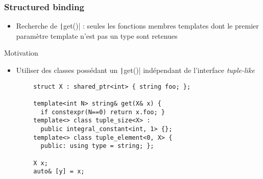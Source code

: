 \documentclass[C++.tex]{subfiles}
\begin{document}
\begin{frame}[fragile]
	\frametitle{Structured binding}
	\begin{itemize}
		\item Recherche de \texttt|get()| : seules les fonctions membres templates dont le premier paramètre template n'est pas un type sont retenues
	\end{itemize}

	\begin{block}{Motivation}
		\begin{itemize}
			\item Utiliser des classes possédant un \texttt|get()| indépendant de l'interface \textit{tuple-like}
		\end{itemize}
	\end{block}

	\begin{verbatim}
		struct X : shared_ptr<int> { string foo; };

		template<int N> string& get(X& x) { 
		  if constexpr(N==0) return x.foo; }
		template<> class tuple_size<X> : 
		  public integral_constant<int, 1> {};
		template<> class tuple_element<0, X> {
		  public: using type = string; };

		X x;
		auto& [y] = x;
	\end{verbatim}


\end{frame}
\end{document}
